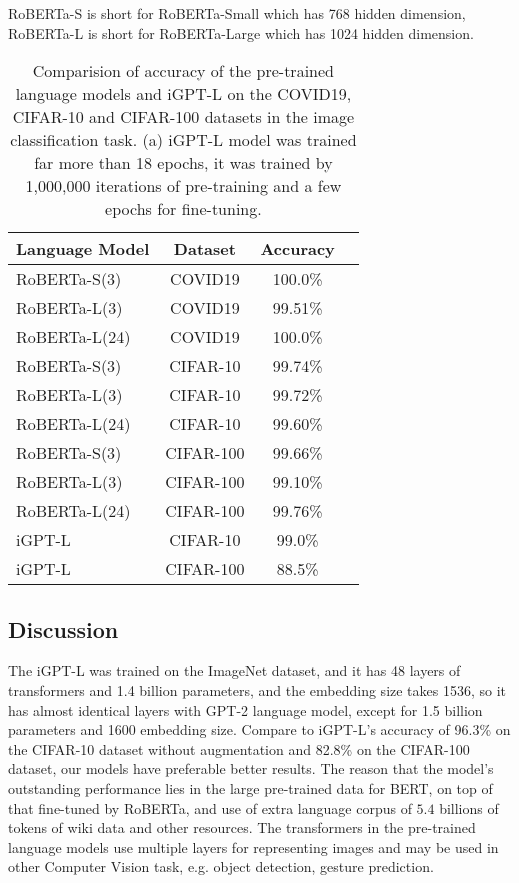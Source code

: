 \documentclass[runningheads]{llncs}
\begin{document}
\par RoBERTa-S is short for RoBERTa-Small which has 768 hidden dimension, RoBERTa-L is short for RoBERTa-Large  which has 1024 hidden dimension.

\begin{table}
\begin{center}
\begin{tabular}{|l|c|c|r|}
\hline
Language Model 	& Dataset  & Accuracy \\
\hline
\hline
RoBERTa-S(3)   & COVID19 	&	100.0\% \\
RoBERTa-L(3)  & COVID19 	&	99.51\% \\
RoBERTa-L(24)  & COVID19 	&	100.0\% \\
\hline
RoBERTa-S(3)   & CIFAR-10 	&	99.74\% \\
RoBERTa-L(3)  & CIFAR-10 	&	99.72\% \\
RoBERTa-L(24)  & CIFAR-10 	&	99.60\% \\
\hline
RoBERTa-S(3)    & CIFAR-100 	&	99.66\% \\
RoBERTa-L(3)  & CIFAR-100   & 	99.10\% \\
RoBERTa-L(24) & CIFAR-100  &	99.76\% \\
\hline\hline
iGPT-L & CIFAR-10  & 99.0\% \\
iGPT-L & CIFAR-100 & 88.5\% \\
\hline
\end{tabular}
\end{center}
\caption{Comparision of accuracy of the pre-trained language models and iGPT-L on the COVID19, CIFAR-10 and CIFAR-100 datasets in the image classification task.
    (a) iGPT-L model was trained far more than 18 epochs, it was trained by 1,000,000 iterations of pre-training and a few epochs for fine-tuning.}
\end{table}


\subsection{Discussion}

The iGPT-L was trained on the ImageNet dataset, and it has 48 layers of transformers and 1.4 billion parameters, and the embedding size takes 1536,
so it has almost identical layers with GPT-2 language model, except for 1.5 billion parameters and 1600 embedding size.
Compare to iGPT-L's accuracy of 96.3\% on the CIFAR-10 dataset without augmentation and 82.8\% on the CIFAR-100 dataset, our models have preferable better results.
The reason that the model's outstanding performance lies in the large pre-trained data for BERT, on top of that fine-tuned by RoBERTa, and use of extra language corpus of
$5.4$ billions of tokens of wiki data and other resources.
The transformers in the pre-trained language models use multiple layers for representing images and may be used in other Computer Vision task, e.g. object detection, gesture prediction.
\end{document}

